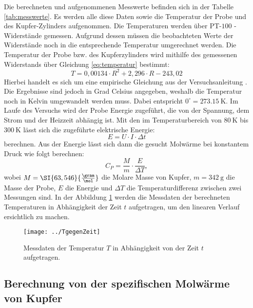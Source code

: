Die berechneten und aufgenommenen Messwerte befinden sich in der Tabelle \ref{tab:messwerte}. Es werden alle diese Daten sowie die Temperatur der Probe und des Kupfer-Zylinders aufgenommen. Die Temperaturen werden über PT-$100$ - Widerstände gemessen. Aufgrund dessen müssen die beobachteten Werte der Widerstände noch in die entsprechende Temperatur umgerechnet werden.
Die Temperatur der Probe bzw. des Kupferzylinders wird mithilfe des gemessenen Widerstands über Gleichung \ref{eq:temperatur} bestimmt:
\begin{equation}
\label{eq:temperatur}
T = 0,00134 \cdot R^2 + 2,296 \cdot R - 243,02
\end{equation}
Hierbei handelt es sich um eine empirische Gleichung aus der Versuchsanleitung \cite{anleitungV47}. Die Ergebnisse sind jedoch in Grad Celsius angegeben, weshalb die Temperatur noch in Kelvin umgewandelt werden muss. Dabei entspricht $0 ^\circ = \SI{273,15}{\kelvin}$. Im Laufe des Versuchs wird der Probe Energie zugeführt, die von der Spannung, dem Strom und der Heizzeit abhängig ist. Mit den im Temperaturbereich von $\SI{80}{\kelvin}$ bis $\SI{300}{\kelvin}$ lässt sich die zugeführte elektrische Energie:
\begin{equation}
E = U \cdot I \cdot \Delta t
\end{equation}
berechnen. Aus der Energie lässt sich dann die gesucht Molwärme bei konstantem Druck wie folgt berechnen:
\begin{equation}
C_P = \frac{M}{m} \cdot \frac{E}{\Delta T} ,
\end{equation}
wobei $M = \SI{63,546}{\frac{\gram}{\mol}}$ \cite{AtommasseKupfer} die Molare Masse von Kupfer, $m = \SI{342}{\gram}$ \cite[6]{anleitungV47} die Masse der Probe, $E$ die Energie und $\Delta T$ die Temperaturdifferenz zwischen zwei Messungen sind.  
In der Abbildung \ref{fig:tgegenzeit} werden die Messdaten der berechneten Temperaturen in Abhängigkeit der Zeit $t$ aufgetragen, um den linearen Verlauf ersichtlich zu machen.

\begin{figure}[h!]
	\centering
	\texttt{[image: ../TgegenZeit]}
	\caption{Messdaten der Temperatur $T$ in Abhängigkeit von der Zeit $t$ aufgetragen. }
	\label{fig:tgegenzeit}
\end{figure}

\subsection{Berechnung von der spezifischen Molwärme von Kupfer}

